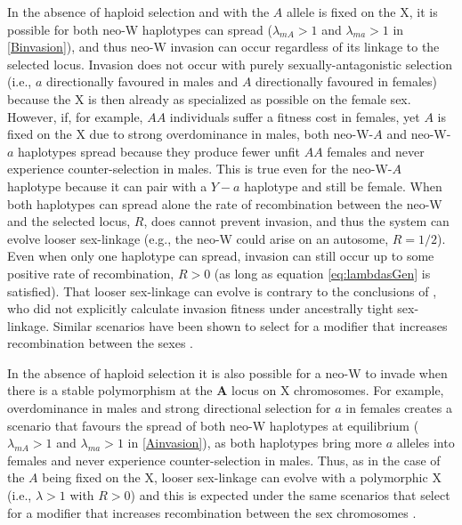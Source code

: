 \documentclass[12pt]{article}
\begin{document}
In the absence of haploid selection and with the $A$ allele is fixed on the X, it is possible for both neo-W haplotypes can spread ($\lambda_{mA}>1$ and $\lambda_{ma}>1$ in \ref{Binvasion}), and thus neo-W invasion can occur regardless of its linkage to the selected locus.
Invasion does not occur with purely sexually-antagonistic selection (i.e., $a$ directionally favoured in males and $A$ directionally favoured in females) because the X is then already as specialized as possible on the female sex.
However, if, for example, $AA$ individuals suffer a fitness cost in females, yet $A$ is fixed on the X due to strong overdominance in males, both neo-W-$A$ and neo-W-$a$ haplotypes spread because they produce fewer unfit $AA$ females and never experience counter-selection in males.
This is true even for the neo-W-$A$ haplotype because it can pair with a $Y-a$ haplotype and still be female. 
When both haplotypes can spread alone the rate of recombination between the neo-W and the selected locus, $R$, does cannot prevent invasion, and thus the system can evolve looser sex-linkage (e.g., the neo-W could arise on an autosome, $R=1/2$).
Even when only one haplotype can spread, invasion can still occur up to some positive rate of recombination, $R>0$ (as long as equation \ref{eq:lambdasGen} is satisfied). 
That looser sex-linkage can evolve is contrary to the conclusions of \cite{vanDoorn:2010hu}, who did not explicitly calculate invasion fitness under ancestrally tight sex-linkage.
Similar scenarios have been shown to select for a modifier that increases recombination between the sexes \citep[green regions of Figure 2 in][]{Otto2014}.

In the absence of haploid selection it is also possible for a neo-W to invade when there is a stable polymorphism at the $\mathbf{A}$ locus on X chromosomes.
For example, overdominance in males and strong directional selection for $a$ in females creates a scenario that favours the spread of both neo-W haplotypes at equilibrium ($\lambda_{mA}>1$ and $\lambda_{ma}>1$ in \ref{Ainvasion}), as both haplotypes bring more $a$ alleles into females and never experience counter-selection in males.
Thus, as in the case of the $A$ being fixed on the X, looser sex-linkage can evolve with a polymorphic X (i.e., $\lambda>1$ with $R>0$) and this is expected under the same scenarios that select for a modifier that increases recombination between the sex chromosomes \citep[blue regions of Figure 2 in][]{Otto2014}.

\end{document}

